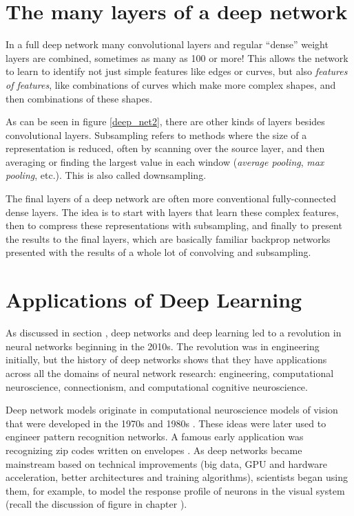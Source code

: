 \section{The many layers of a deep network}

In a full deep network many convolutional layers and regular ``dense'' weight layers are combined, sometimes as many as 100 or more! This allows the network to learn to identify not just simple features like edges or curves, but also \emph{features of features}, like combinations of curves which make more complex shapes, and then combinations of these shapes. 

As can be seen in figure \ref{deep_net2}, there are other kinds of layers besides convolutional layers. Subsampling refers to methods where the size of a representation is reduced, often by scanning over the source layer, and then averaging or finding the largest value in each window (\emph{average pooling}, \emph{max pooling}, etc.).  This is also called downsampling.  

The final layers of a deep network are often more conventional fully-connected dense layers. The idea is to start with layers that learn these complex features, then to compress these representations with subsampling, and finally to present the results to the final layers, which are basically familiar backprop networks presented with the results of a whole lot of convolving and subsampling.

\section{Applications of Deep Learning}


As discussed in section , deep networks and deep learning led to a revolution in neural networks beginning in the 2010s. The revolution was in engineering initially, but the history of deep networks shows that they have applications across all the domains of neural network research: engineering, computational neuroscience, connectionism, and computational cognitive neuroscience. 

Deep network models originate in  computational neuroscience models of vision that were developed in the 1970s and 1980s \cite{fukushima1982neocognitron}.  These ideas were later used to engineer pattern recognition networks. A famous early application was recognizing zip codes written on envelopes \cite{lecun1989backpropagation}. As deep networks became mainstream based on technical improvements (big data, GPU and hardware acceleration, better architectures and training algorithms), scientists began using them, for example, to model the response profile of neurons in the visual system (recall the discussion of figure  in chapter ). 

